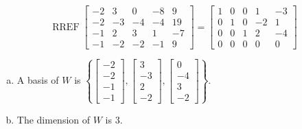 \begin{exerciseAnswer} 


\[\operatorname{RREF} \left[\begin{array}{ccccc}
-2 & 3 & 0 & -8 & 9 \\
-2 & -3 & -4 & -4 & 19 \\
-1 & 2 & 3 & 1 & -7 \\
-1 & -2 & -2 & -1 & 9
\end{array}\right] = \left[\begin{array}{ccccc}
1 & 0 & 0 & 1 & -3 \\
0 & 1 & 0 & -2 & 1 \\
0 & 0 & 1 & 2 & -4 \\
0 & 0 & 0 & 0 & 0
\end{array}\right] \]


\begin{enumerate}[(a)]
\item A basis of \(W\) is \( \left\{ \left[\begin{array}{c}
-2 \\
-2 \\
-1 \\
-1
\end{array}\right] , \left[\begin{array}{c}
3 \\
-3 \\
2 \\
-2
\end{array}\right] , \left[\begin{array}{c}
0 \\
-4 \\
3 \\
-2
\end{array}\right] \right\} \).
\item The dimension of \(W\) is \( 3 \).
\end{enumerate}
    
\end{exerciseAnswer}
    
